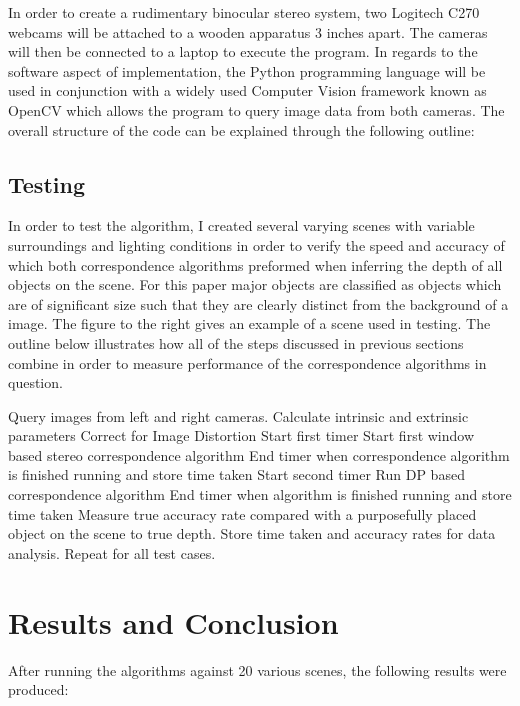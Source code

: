 \documentclass[11pt]{scrartcl}
\begin{document}
In order to create a rudimentary binocular stereo system, two Logitech C270 webcams will be attached to a wooden apparatus 3 inches apart. The cameras will then be connected to a laptop to execute the program. In regards to the software aspect of implementation, the Python programming language will be used in conjunction with a widely used Computer Vision framework known as OpenCV which allows the program to query image data from both cameras. The overall structure of the code can be explained through the following outline:



\subsection{Testing}
In order to test the algorithm, I created several varying scenes with variable surroundings 
and lighting conditions in order to verify the speed and accuracy of which both correspondence
algorithms preformed when inferring the depth of all objects on the scene. For this paper 
major objects are classified as objects which are of significant size such that they are clearly 
distinct from the background of a image. The figure to the right gives an example of a scene used 
in testing. The outline below illustrates how all of the steps discussed in previous sections 
combine in order to measure performance of the correspondence algorithms in question. 
\begin{outline}[enumerate]
	\1 Query images from left and right cameras.  
	\1 Calculate intrinsic and extrinsic parameters 
	\1 Correct for Image Distortion 
	\1 Start first timer 
	\1 Start first window based stereo correspondence algorithm 
	\1 End timer when correspondence algorithm is finished running and store time taken 
	\1 Start second timer
	\1 Run DP based correspondence algorithm 
	\1 End timer when algorithm is finished running and store time taken
	\1 Measure true accuracy rate compared with a purposefully placed object on the scene 
	to true depth. 
	\1 Store time taken and accuracy rates for data analysis. 
	\1 Repeat for all test cases. 
\end{outline}
\section{Results and Conclusion}

After running the algorithms against 20 various scenes, the following results were 
produced:
\\
\end{document}

